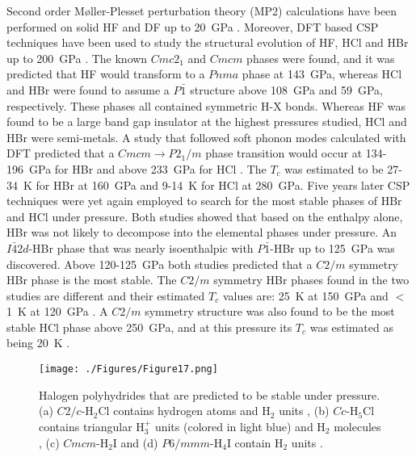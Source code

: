 \documentclass[12pt,letterpaper,oneside]{article}
\begin{document}
Second order M\o ller-Plesset perturbation theory (MP2) calculations have been performed on solid HF and DF up to 20~GPa \cite{Sode:2012a}. Moreover, DFT based CSP techniques have been used to study the structural evolution of HF, HCl and HBr up to 200~GPa \cite{Zhang:2010a}. The known $Cmc2_1$ and $Cmcm$ phases were found, and it was predicted that HF would transform to a $Pnma$ phase at 143~GPa, whereas HCl and HBr were found to assume a $P\bar{1}$ structure above 108~GPa and 59~GPa, respectively. These phases all contained symmetric H-X bonds. Whereas HF was found to be a large band gap insulator at the highest pressures studied, HCl and HBr were semi-metals. A study that followed soft phonon modes calculated with DFT predicted that a $Cmcm \rightarrow P2_1/m$ phase transition would occur at 134-196~GPa for HBr and above 233~GPa for HCl  \cite{Duan:2010}. The $T_c$ was estimated to be 27-34~K for HBr at 160~GPa and 9-14~K for HCl at 280~GPa. Five years later CSP techniques were yet again employed to search for the most stable phases of HBr \cite{Chen:2015a,Lu:2015a} and HCl \cite{Chen:2015a} under pressure. Both studies showed that based on the enthalpy alone, HBr was not likely to decompose into the elemental phases under pressure. An $I\bar{4}2d$-HBr \cite{Lu:2015a} phase that was nearly isoenthalpic with $P\bar{1}$-HBr up to 125~GPa was discovered. Above 120-125~GPa both studies predicted that a $C2/m$ symmetry HBr phase \cite{Lu:2015a,Chen:2015a} is the most stable. The $C2/m$ symmetry HBr phases found in the two studies are different and their estimated $T_c$ values are: 25~K at 150~GPa \cite{Lu:2015a} and $<$1~K at 120~GPa \cite{Chen:2015a}. A $C2/m$ symmetry structure was also found to be the most stable HCl phase above 250~GPa, and at this pressure its $T_c$ was estimated as being 20~K \cite{Chen:2015a}. 

\begin{figure}[h!]
\begin{center}
\texttt{[image: ./Figures/Figure17.png]}
\end{center}
\caption{Halogen polyhydrides that are predicted to be stable under pressure. (a) $C2/c$-H$_2$Cl contains hydrogen atoms and H$_2$ units \cite{Wang:2015-17}, (b) $Cc$-H$_5$Cl contains triangular H$_3^+$ units (colored in light blue) and H$_2$ molecules \cite{Wang:2015-17}, (c) $Cmcm$-H$_2$I and (d) $P6/mmm$-H$_4$I contain H$_2$ units \cite{Shamp:2015,Duan:2015-I}. }
\label{fig:halogen}
\end{figure}
\end{document}
